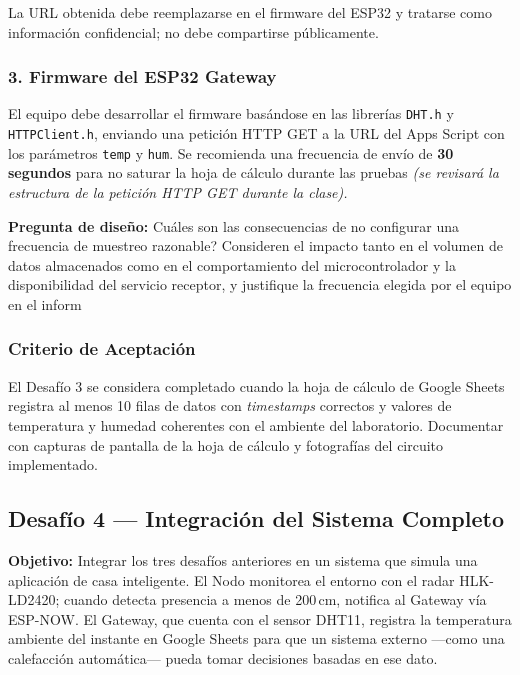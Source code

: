 \documentclass[12pt,leqno]{article}
\begin{document}
\noindent La URL obtenida debe reemplazarse en el firmware del ESP32 y tratarse como
informaci\'on confidencial; no debe compartirse p\'ublicamente.


\pagebreak
\subsubsection*{3. Firmware del ESP32 Gateway}

El equipo debe desarrollar el firmware bas\'andose en las librer\'ias \texttt{DHT.h}
y \texttt{HTTPClient.h}, enviando una petici\'on HTTP GET a la URL del Apps Script
con los par\'ametros \texttt{temp} y \texttt{hum}. Se recomienda una frecuencia de
env\'io de \textbf{30 segundos} para no saturar la hoja de c\'alculo durante las
pruebas \textit{(se revisar\'a la estructura de la petici\'on HTTP GET durante la
clase).}

\noindent\textbf{Pregunta de dise\~no:} \textquestiondown Cu\'ales son las
consecuencias de no configurar una frecuencia de muestreo razonable? Consideren
el impacto tanto en el volumen de datos almacenados como en el comportamiento
del microcontrolador y la disponibilidad del servicio receptor, y justifique
la frecuencia elegida por el equipo en el inform

\subsubsection*{Criterio de Aceptaci\'on}

El Desaf\'io 3 se considera completado cuando la hoja de c\'alculo de Google Sheets
registra al menos 10 filas de datos con \textit{timestamps} correctos y valores de
temperatura y humedad coherentes con el ambiente del laboratorio. Documentar con
capturas de pantalla de la hoja de c\'alculo y fotograf\'ias del circuito
implementado.

\bigskip

\subsection{Desaf\'io 4 --- Integraci\'on del Sistema Completo}
\label{sec:desafio4}

\textbf{Objetivo:} Integrar los tres desaf\'ios anteriores en un sistema que simula
una aplicaci\'on de casa inteligente. El Nodo monitorea el entorno con el radar
HLK-LD2420; cuando detecta presencia a menos de 200\,cm, notifica al Gateway v\'ia
ESP-NOW. El Gateway, que cuenta con el sensor DHT11, registra la temperatura ambiente
del instante en Google Sheets para que un sistema externo ---como una calefacci\'on
autom\'atica--- pueda tomar decisiones basadas en ese dato.
\end{document}
